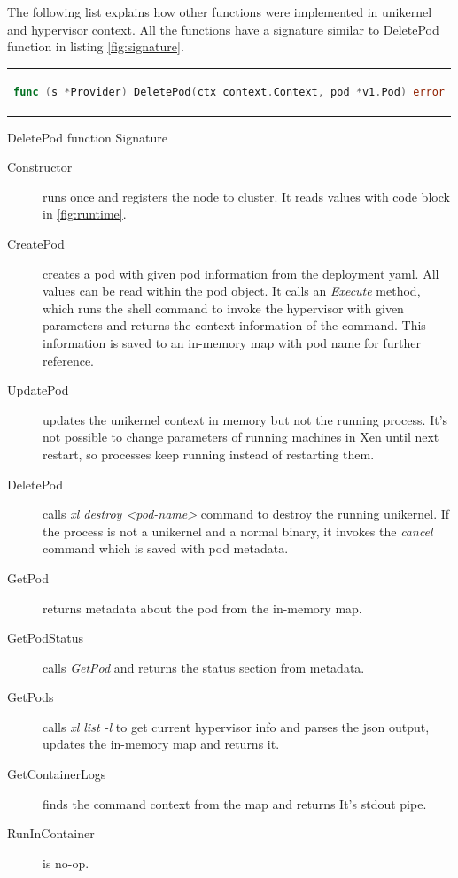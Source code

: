 

The following list explains how other functions were implemented in unikernel and hypervisor context. All the functions have a signature similar to DeletePod function in listing \ref{fig:signature}.

\begin{code}[htpb]
  \centering
  \begin{tabular}{c}
  \begin{lstlisting}[language=go]
    func (s *Provider) DeletePod(ctx context.Context, pod *v1.Pod) error
\end{lstlisting}
\end{tabular}
\caption{DeletePod function Signature}\label{fig:signature}
\end{code}


\begin{description}
  \item  [Constructor] runs once and registers the node to cluster. It reads values with code block in \ref{fig:runtime}.
  \item [CreatePod] creates a pod with given pod information from the deployment yaml. All values can be read within the pod object. It calls an \textit{Execute} method, which runs the shell command to invoke the hypervisor with given parameters and returns the context information of the command. This information is saved to an in-memory map with pod name for further reference.
  \item [UpdatePod] updates the unikernel context in memory but not the running process. It's not possible to change parameters of running machines in Xen until next restart, so processes keep running instead of restarting them.
  \item [DeletePod] calls \textit{xl destroy <pod-name>} command to destroy the running unikernel. If the process is not a unikernel and a normal binary, it invokes the \textit{cancel} command which is saved with pod metadata.
  \item [GetPod] returns metadata about the pod from the in-memory map.
  \item [GetPodStatus] calls \textit{GetPod} and returns the status section from metadata.
  \item [GetPods] calls \textit{xl list -l} to get current hypervisor info and parses the json output, updates the in-memory map and returns it.
  \item [GetContainerLogs] finds the command context from the map and returns It's stdout pipe.
  \item [RunInContainer] is no-op.

\end{description}
